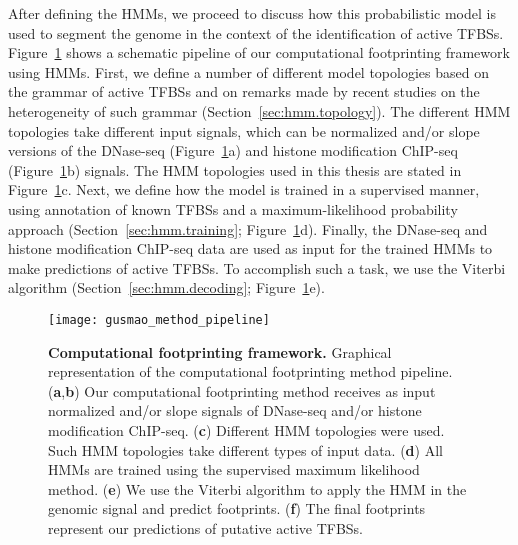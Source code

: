 After defining the HMMs, we proceed to discuss how this probabilistic model is used to segment the genome in the context of the identification of active TFBSs. Figure~\ref{fig:gusmao_method_pipeline} shows a schematic pipeline of our computational footprinting framework using HMMs. First, we define a number of different model topologies based on the grammar of active TFBSs and on remarks made by recent studies on the heterogeneity of such grammar (Section~\ref{sec:hmm.topology}). The different HMM topologies take different input signals, which can be normalized and/or slope versions of the DNase-seq (Figure~\ref{fig:gusmao_method_pipeline}a) and histone modification ChIP-seq (Figure~\ref{fig:gusmao_method_pipeline}b) signals. The HMM topologies used in this thesis are stated in Figure~\ref{fig:gusmao_method_pipeline}c. Next, we define how the model is  trained in a supervised manner, using annotation of known TFBSs and a maximum-likelihood probability approach (Section~\ref{sec:hmm.training}; Figure~\ref{fig:gusmao_method_pipeline}d). Finally, the DNase-seq and histone modification ChIP-seq data are used as input for the trained HMMs to make predictions of active TFBSs. To accomplish such a task, we use the Viterbi algorithm (Section~\ref{sec:hmm.decoding}; Figure~\ref{fig:gusmao_method_pipeline}e).

\begin{figure}[h!]
\centering
\texttt{[image: gusmao\_method\_pipeline]}
\caption[Computational footprinting framework]{\textbf{Computational footprinting framework.} Graphical representation of the computational footprinting method pipeline. (\textbf{a},\textbf{b}) Our computational footprinting method receives as input normalized and/or slope signals of DNase-seq and/or histone modification ChIP-seq. (\textbf{c}) Different HMM topologies were used. Such HMM topologies take different types of input data. (\textbf{d}) All HMMs are trained using the supervised maximum likelihood method. (\textbf{e}) We use the Viterbi algorithm to apply the HMM in the genomic signal and predict footprints. (\textbf{f}) The final footprints represent our predictions of putative active TFBSs.}
\label{fig:gusmao_method_pipeline}
\end{figure}

